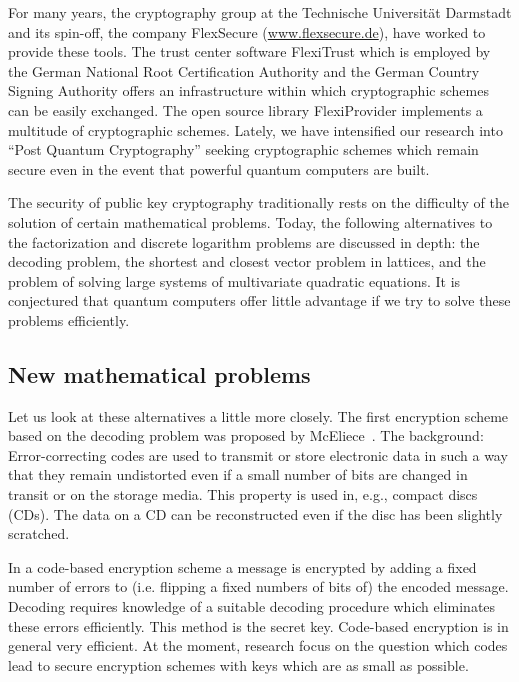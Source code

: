 For many years, the cryptography group at the
Technische Universit\"at Darmstadt and its spin-off,
the company FlexSecure (\url{www.flexsecure.de}),
have worked to provide these tools.  The
trust center software FlexiTrust which is employed
by the German National Root Certification
Authority and the German Country Signing Authority
offers an infrastructure within which
cryptographic schemes can be easily exchanged.
The open source library FlexiProvider implements a
multitude of cryptographic schemes.  Lately, we
have intensified our research into ``Post Quantum
Cryptography'' seeking
cryptographic schemes which
remain secure even in the event that powerful
quantum computers are built.

The security of public key cryptography
traditionally rests on the difficulty of the
solution of certain mathematical problems.  Today,
the following alternatives to the factorization and discrete
logarithm problems are discussed in depth:  the
decoding problem, the shortest and closest vector
problem in lattices, and the problem of solving
large systems of multivariate quadratic
equations.  It is conjectured that quantum
computers offer little advantage if we try to
solve these problems efficiently.


\subsection{New mathematical problems}
\label{sec:problems}

Let us look at these alternatives a little more
closely.  The first encryption scheme based on the
decoding problem was proposed by
McEliece~\cite{mceliece:1978}.  The background:
Error-correcting codes are used to transmit or
store electronic data in such a way that they
remain undistorted even if a small number of bits
are changed in transit or on the storage media.
This property is used in, e.g., compact discs
(CDs).  The data on a CD can be reconstructed even
if the disc has been slightly scratched.

In a code-based encryption scheme a message is
encrypted by adding a fixed number of errors to
(i.e. flipping a fixed numbers of bits of) the
encoded message.  Decoding requires knowledge of a
suitable decoding procedure which eliminates these
errors efficiently.  This method is the secret
key.  Code-based encryption is in general very
efficient.  At the moment, research focus on the
question which codes lead to secure encryption
schemes with keys which are as small as possible.

